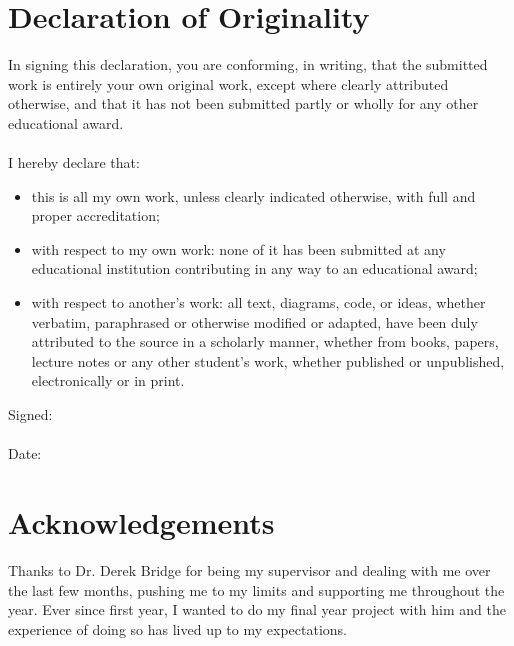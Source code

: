 \documentclass[12pt]{article}
\begin{document}
\section*{Declaration of Originality}
In signing this declaration, you are conforming, in writing, that the submitted work is entirely your own original work, except where clearly attributed otherwise, and that it has not been submitted partly or wholly for any other educational award.
\\\\
I hereby declare that:
\begin{itemize}
  \item this is all my own work, unless clearly indicated otherwise, with full and proper accreditation;
  \item with respect to my own work: none of it has been submitted at any educational institution contributing in any way to an educational award;
  \item with respect to another’s work: all text, diagrams, code, or ideas, whether verbatim, paraphrased or otherwise modified or adapted, have been duly attributed to the source in a scholarly manner, whether from books, papers, lecture notes or any other student’s work, whether published or unpublished, electronically or in print.
\end{itemize}
\vspace{10mm}
\noindent Signed:\dotfill
\\\\
Date:\dotfill
\clearpage

\section*{Acknowledgements}
Thanks to Dr. Derek Bridge for being my supervisor and dealing with me over the last few months, pushing me to my limits and supporting me throughout the year. Ever since first year, I wanted to do my final year project with him and the experience of doing so has lived up to my expectations. 
\clearpage


\tableofcontents
\thispagestyle{empty}
\cleardoublepage
\end{document}
